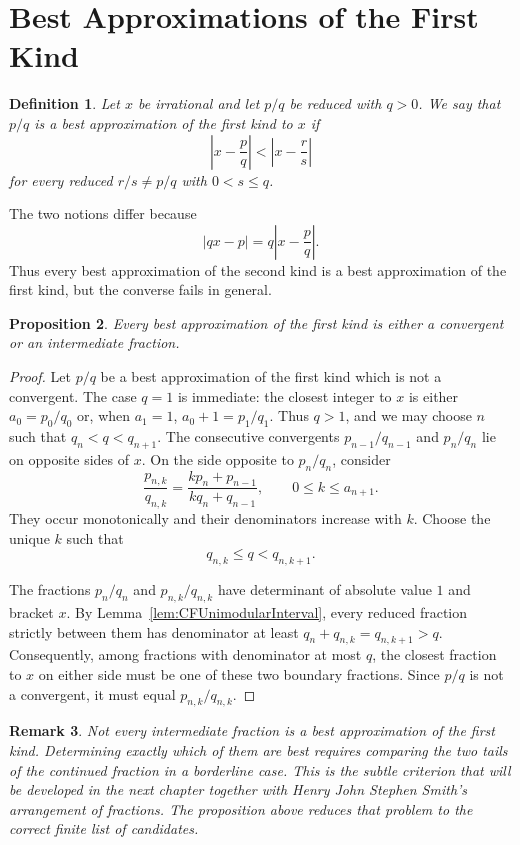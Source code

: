 \documentclass{book}
\newtheorem{definition}{Definition}[section]
\newtheorem{proposition}[definition]{Proposition}
\newtheorem{remark}[definition]{Remark}
\begin{document}
\section{Best Approximations of the First Kind}

\begin{definition}
  Let \(x\) be irrational and let \(p/q\) be reduced with \(q>0\). We say
  that \(p/q\) is a \textnormal{best approximation of the first kind} to
  \(x\) if
  \[
    \left|x-\frac pq\right|
    <
    \left|x-\frac rs\right|
  \]
  for every reduced \(r/s\neq p/q\) with \(0<s\leq q\).
\end{definition}

The two notions differ because
\[
  |qx-p|=q\left|x-\frac pq\right|.
\]
Thus every best approximation of the second kind is a best approximation of
the first kind, but the converse fails in general.

\begin{proposition}\label{prop:CFBestFirstKindCandidates}
  Every best approximation of the first kind is either a convergent or an
  intermediate fraction.
\end{proposition}

\begin{proof}
  Let \(p/q\) be a best approximation of the first kind which is not a
  convergent. The case \(q=1\) is immediate: the closest integer to \(x\) is
  either \(a_0=p_0/q_0\) or, when \(a_1=1\), \(a_0+1=p_1/q_1\). Thus
  \(q>1\), and we may choose \(n\) such that
  \(q_n<q<q_{n+1}\). The consecutive
  convergents \(p_{n-1}/q_{n-1}\) and \(p_n/q_n\) lie on opposite sides of
  \(x\). On the side opposite to \(p_n/q_n\), consider
  \[
    \frac{p_{n,k}}{q_{n,k}}
    =\frac{kp_n+p_{n-1}}{kq_n+q_{n-1}},
    \qquad 0\leq k\leq a_{n+1}.
  \]
  They occur monotonically and their denominators increase with \(k\).
  Choose the unique \(k\) such that
  \[
    q_{n,k}\leq q<q_{n,k+1}.
  \]

  The fractions \(p_n/q_n\) and \(p_{n,k}/q_{n,k}\) have determinant of
  absolute value \(1\) and bracket \(x\). By
  Lemma~\ref{lem:CFUnimodularInterval}, every reduced fraction strictly
  between them has denominator at least
  \(q_n+q_{n,k}=q_{n,k+1}>q\). Consequently, among fractions with
  denominator at most \(q\), the closest fraction to \(x\) on either side
  must be one of these two boundary fractions. Since \(p/q\) is not a
  convergent, it must equal \(p_{n,k}/q_{n,k}\).
\end{proof}

\begin{remark}\label{rem:CFFirstKindDeferred}
  Not every intermediate fraction is a best approximation of the first
  kind. Determining exactly which of them are best requires comparing the
  two tails of the continued fraction in a borderline case. This is the
  subtle criterion that will be developed in the next chapter together with
  Henry John Stephen Smith's arrangement of fractions. The proposition
  above reduces that problem to the correct finite list of candidates.
\end{remark}
\end{document}
